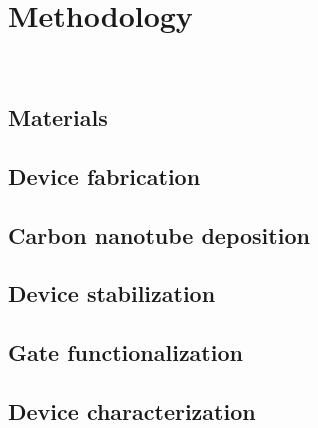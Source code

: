 \chapter{Methodology}
\label{cap:MatsMets}

\newpage
\thispagestyle{empty}
\ %
\newpage

\section{Materials} 
\label{sec:materials}




\section{Device fabrication} 
\label{sec:fabrication}




\section{Carbon nanotube deposition}
\label{sec:cntDeposition}




\section{Device stabilization}
\label{sec:membrane_stabilization}




\section{Gate functionalization} 
\label{sec:functionalization}




\section{Device characterization}
\label{sec:characterization}




\newpage
\thispagestyle{empty}
\ %
\newpage